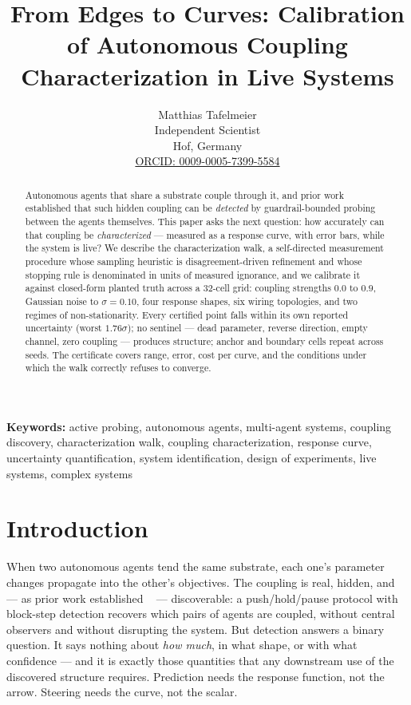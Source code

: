 \documentclass[11pt,a4paper]{article}
\title{From Edges to Curves: Calibration of Autonomous Coupling
       Characterization in Live Systems}
\author{
  Matthias Tafelmeier \\
  Independent Scientist \\
  Hof, Germany \\
  \href{https://orcid.org/0009-0005-7399-5584}{ORCID: 0009-0005-7399-5584}
}
\date{}
\begin{document}
\maketitle

\begin{abstract}
Autonomous agents that share a substrate couple through it, and
prior work established that such hidden coupling can be
\emph{detected} by guardrail-bounded probing between the agents
themselves. This paper asks the next question: how accurately can
that coupling be \emph{characterized} --- measured as a response
curve, with error bars, while the system is live? We describe the
characterization walk, a self-directed measurement procedure whose
sampling heuristic is disagreement-driven refinement and whose
stopping rule is denominated in units of measured ignorance, and we
calibrate it against closed-form planted truth across a 32-cell
grid: coupling strengths $0.0$ to $0.9$, Gaussian noise to
$\sigma{=}0.10$, four response shapes, six wiring topologies, and
two regimes of non-stationarity. Every certified point falls within
its own reported uncertainty (worst $1.76\sigma$); no sentinel ---
dead parameter, reverse direction, empty channel, zero coupling ---
produces structure; anchor and boundary cells repeat across seeds.
The certificate covers range, error, cost per curve, and the
conditions under which the walk correctly refuses to converge.
\end{abstract}

\noindent\textbf{Keywords:} active probing, autonomous agents,
multi-agent systems, coupling discovery, characterization walk,
coupling characterization, response curve, uncertainty quantification, system
identification, design of experiments, live systems, complex systems

\section{Introduction}
\label{sec:intro}

When two autonomous agents tend the same substrate, each one's
parameter changes propagate into the other's objectives. The
coupling is real, hidden, and --- as prior work established
~\cite{p1} --- discoverable: a push/hold/pause protocol with
block-step detection recovers which pairs of agents are coupled,
without central observers and without disrupting the system. But
detection answers a binary question. It says nothing about
\emph{how much}, in what shape, or with what confidence --- and it
is exactly those quantities that any downstream use of the
discovered structure requires. Prediction needs the response
function, not the arrow. Steering needs the curve, not the scalar.
\end{document}
